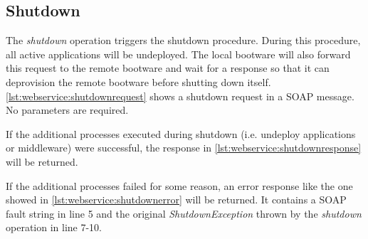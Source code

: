 \subsection{Shutdown}

The \textit{shutdown} operation triggers the shutdown procedure.
During this procedure, all active applications will be undeployed.
The local bootware will also forward this request to the remote bootware and wait for a response so that it can deprovision the remote bootware before shutting down itself.
\autoref{lst:webservice:shutdownrequest} shows a shutdown request in a SOAP message.
No parameters are required.

\vspace*{\baselineskip}

If the additional processes executed during shutdown (i.e. undeploy applications or middleware) were successful, the response in \autoref{lst:webservice:shutdownresponse} will be returned.

\vspace*{\baselineskip}

If the additional processes failed for some reason, an error response like the one showed in \autoref{lst:webservice:shutdownerror} will be returned.
It contains a SOAP fault string in line 5 and the original \textit{ShutdownException} thrown by the \textit{shutdown} operation in line 7-10.

\vspace*{\baselineskip}
